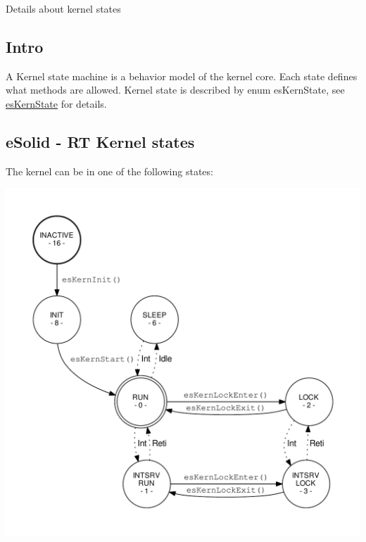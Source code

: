 Details about kernel states\hypertarget{states_states_intro}{}\subsection{Intro}\label{states_states_intro}
A Kernel state machine is a behavior model of the kernel core. Each state defines what methods are allowed. Kernel state is described by {\ttfamily enum es\-Kern\-State}, see \hyperlink{group__kern__ctrl_gac9be6bfeddbd6af148cdb3867fbc24af}{es\-Kern\-State} for details.\hypertarget{states_states_fsm}{}\subsection{e\-Solid -\/ R\-T Kernel states}\label{states_states_fsm}
The kernel can be in one of the following states\-: \begin{center}

\begin{DoxyImageNoCaption}
  \mbox{\includegraphics[width=\textwidth,height=\textheight/2,keepaspectratio=true]{dot_inline_dotgraph_1}}
\end{DoxyImageNoCaption}
\end{center}


